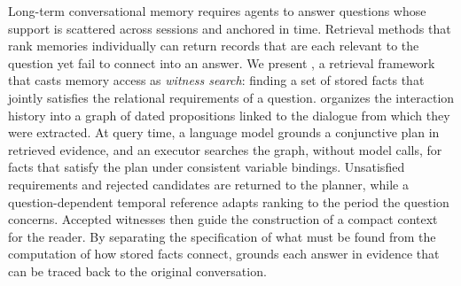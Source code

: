 Long-term conversational memory requires agents to answer questions
whose support is scattered across sessions and anchored in time.
Retrieval methods that rank memories individually can return records
that are each relevant to the question yet fail to connect into an
answer. We present \sys, a retrieval framework that casts memory access
as \emph{witness search}: finding a set of stored facts that jointly
satisfies the relational requirements of a question. \sys organizes the
interaction history into a graph of dated propositions linked to the
dialogue from which they were extracted. At query time, a language
model grounds a conjunctive plan in retrieved evidence, and an executor
searches the graph, without model calls, for facts that satisfy
the plan under consistent variable bindings. Unsatisfied requirements
and rejected candidates are returned to the planner, while a
question-dependent temporal reference adapts ranking to the period the
question concerns. Accepted witnesses then guide the construction of a
compact context for the reader. By separating the specification of what
must be found from the computation of how stored facts connect, \sys
grounds each answer in evidence that can be traced back to the original
conversation.

